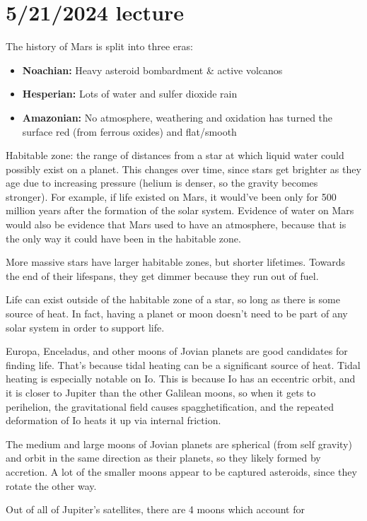 \documentclass[class=article, crop=false]{standalone}
\begin{document}
\section{5/21/2024 lecture}
The history of Mars is split into three eras:
\begin{itemize}
    \item \textbf{Noachian:} Heavy asteroid bombardment \& active volcanos
    \item \textbf{Hesperian:} Lots of water and sulfer dioxide rain
    \item \textbf{Amazonian:} No atmosphere, weathering and oxidation has turned the surface red (from ferrous oxides) and flat/smooth
\end{itemize}
Habitable zone: the range of distances from a star at which liquid water could possibly exist on a planet. This changes over time, since stars get brighter as they age due to increasing pressure (helium is denser, so the gravity becomes stronger). For example, if life existed on Mars, it would've been only for 500 million years after the formation of the solar system. Evidence of water on Mars would also be evidence that Mars used to have an atmosphere, because that is the only way it could have been in the habitable zone.
\par
More massive stars have larger habitable zones, but shorter lifetimes. Towards the end of their lifespans, they get dimmer because they run out of fuel.
\par
Life can exist outside of the habitable zone of a star, so long as there is some source of heat. In fact, having a planet or moon doesn't need to be part of any solar system in order to support life.
\par
Europa, Enceladus, and other moons of Jovian planets are good candidates for finding life. That's because tidal heating can be a significant source of heat. Tidal heating is especially notable on Io. This is because Io has an eccentric orbit, and it is closer to Jupiter than the other Galilean moons, so when it gets to perihelion, the gravitational field causes spagghetification, and the repeated deformation of Io heats it up via internal friction.
\par
The medium and large moons of Jovian planets are spherical (from self gravity) and orbit in the same direction as their planets, so they likely formed by accretion. A lot of the smaller moons appear to be captured asteroids, since they rotate the other way.
\par
Out of all of Jupiter's satellites, there are 4 moons which account for 
\end{document}
